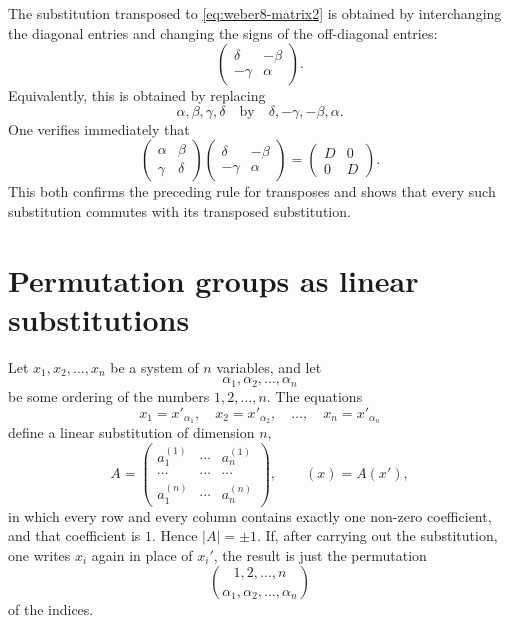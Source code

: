 \documentclass[11pt]{article}
\begin{document}
The substitution transposed to \eqref{eq:weber8-matrix2} is obtained by interchanging the diagonal entries and changing the signs of the off-diagonal entries:
\begin{equation}\label{eq:weber8-mobius-adjoint}
\begin{pmatrix}\delta&-\beta\\ -\gamma&\alpha\end{pmatrix}.
\end{equation}
Equivalently, this is obtained by replacing
\[
\alpha,\beta,\gamma,\delta
\quad\text{by}\quad
\delta,-\gamma,-\beta,\alpha.
\]
One verifies immediately that
\begin{equation}\label{eq:weber8-mobius-adjoint-product}
\begin{pmatrix}\alpha&\beta\\ \gamma&\delta\end{pmatrix}
\begin{pmatrix}\delta&-\beta\\ -\gamma&\alpha\end{pmatrix}
=
\begin{pmatrix}D&0\\0&D\end{pmatrix}.
\end{equation}
This both confirms the preceding rule for transposes and shows that every such substitution commutes with its transposed substitution.

\section*{Permutation groups as linear substitutions}
Let $x_1,x_2,\ldots,x_n$ be a system of $n$ variables, and let
\[
\alpha_1,\alpha_2,\ldots,\alpha_n
\]
be some ordering of the numbers $1,2,\ldots,n$.  The equations
\begin{equation}\label{eq:weber8-perm-action}
x_1=x'_{\alpha_1},\quad x_2=x'_{\alpha_2},\quad\ldots,\quad x_n=x'_{\alpha_n}
\end{equation}
define a linear substitution of dimension $n$,
\begin{equation}\label{eq:weber8-perm-matrix}
A=\begin{pmatrix}
a_1^{(1)}&\cdots&a_n^{(1)}\\
\cdots&\cdots&\cdots\\
a_1^{(n)}&\cdots&a_n^{(n)}
\end{pmatrix},
\qquad (x)=A(x'),
\end{equation}
in which every row and every column contains exactly one non-zero coefficient, and that coefficient is $1$.  Hence $|A|=\pm1$.  If, after carrying out the substitution, one writes $x_i$ again in place of $x_i'$, the result is just the permutation
\[
\binom{1,2,\ldots,n}{\alpha_1,\alpha_2,\ldots,\alpha_n}
\]
of the indices.
\end{document}
